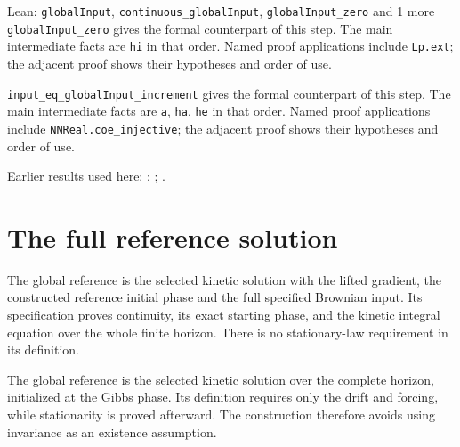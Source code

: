 \documentclass[11pt,a4paper]{article}
\begin{document}
\begin{leanbox}{Lean: \texttt{globalInput}, \texttt{continuous\_\allowbreak{}globalInput}, \texttt{globalInput\_\allowbreak{}zero} and 1 more}
\texttt{global\allowbreak{}Input\_\allowbreak{}zero} gives the formal counterpart of this step. The main intermediate facts are \texttt{hi} in that order. Named proof applications include \texttt{Lp.\allowbreak{}ext}; the adjacent proof shows their hypotheses and order of use.




\texttt{input\_\allowbreak{}eq\_\allowbreak{}global\allowbreak{}Input\_\allowbreak{}increment} gives the formal counterpart of this step. The main intermediate facts are \texttt{a}, \texttt{ha}, \texttt{he} in that order. Named proof applications include \texttt{NNReal.\allowbreak{}coe\_\allowbreak{}injective}; the adjacent proof shows their hypotheses and order of use.
\end{leanbox}


Earlier results used here: \cite[Section~3.17.1]{LangevinLean2026ULASC}; \cite[Section~3.8.2]{LangevinLean2026ULASC}; \cite[Section~3.8.9]{LangevinLean2026ULASC}.

\section{\texorpdfstring{The full reference solution}{The full reference solution}}


The global reference is the selected kinetic solution with the lifted gradient, the constructed reference initial phase and the full specified Brownian input. Its specification proves continuity, its exact starting phase, and the kinetic integral equation over the whole finite horizon. There is no stationary-law requirement in its definition.



The global reference is the selected kinetic solution over the complete horizon, initialized at the Gibbs phase. Its definition requires only the drift and forcing, while stationarity is proved afterward. The construction therefore avoids using invariance as an existence assumption.
\end{document}
